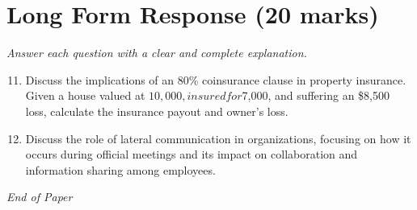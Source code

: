 \documentclass[12pt]{article}
\begin{document}
\section*{Long Form Response (20 marks)}
\textit{Answer each question with a clear and complete explanation.}
\begin{enumerate}[label=\arabic*.]
\setcounter{enumi}{10}
\item Discuss the implications of an 80\% coinsurance clause in property insurance. Given a house valued at $10,000, insured for $7,000, and suffering an \$8,500 loss, calculate the insurance payout and owner's loss.
\item Discuss the role of lateral communication in organizations, focusing on how it occurs during official meetings and its impact on collaboration and information sharing among employees.
\end{enumerate}

\vfill
\noindent\textit{End of Paper}
\end{document}
